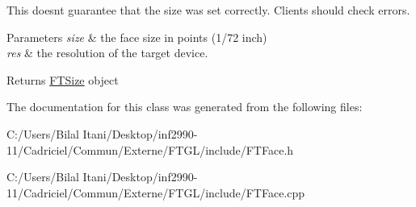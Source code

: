 This doesn\textquotesingle{}t guarantee that the size was set correctly. Clients should check errors.


\begin{DoxyParams}{Parameters}
{\em size} & the face size in points (1/72 inch) \\
\hline
{\em res} & the resolution of the target device. \\
\hline
\end{DoxyParams}
\begin{DoxyReturn}{Returns}
{\ttfamily \hyperlink{class_f_t_size}{F\+T\+Size}} object 
\end{DoxyReturn}


The documentation for this class was generated from the following files\+:\begin{DoxyCompactItemize}
\item 
C\+:/\+Users/\+Bilal Itani/\+Desktop/inf2990-\/11/\+Cadriciel/\+Commun/\+Externe/\+F\+T\+G\+L/include/F\+T\+Face.\+h\item 
C\+:/\+Users/\+Bilal Itani/\+Desktop/inf2990-\/11/\+Cadriciel/\+Commun/\+Externe/\+F\+T\+G\+L/include/F\+T\+Face.\+cpp\end{DoxyCompactItemize}
